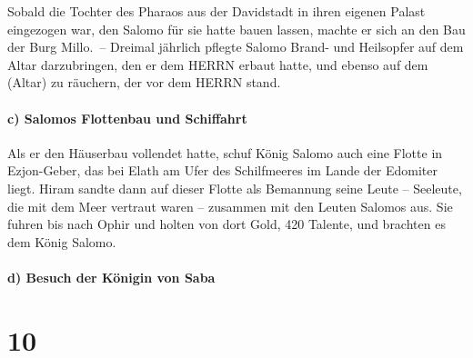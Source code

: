 Sobald die Tochter des Pharaos aus der Davidstadt in
ihren eigenen Palast eingezogen war, den Salomo für sie hatte bauen
lassen, machte er sich an den Bau der Burg Millo.~--
Dreimal jährlich pflegte Salomo Brand- und Heilsopfer auf
dem Altar darzubringen, den er dem HERRN erbaut hatte, und ebenso auf
dem (Altar) zu räuchern, der vor dem HERRN stand.

\hypertarget{c-salomos-flottenbau-und-schiffahrt}{%
\paragraph{c) Salomos Flottenbau und
Schiffahrt}\label{c-salomos-flottenbau-und-schiffahrt}}

Als er den Häuserbau vollendet hatte, schuf König Salomo
auch eine Flotte in Ezjon-Geber, das bei Elath am Ufer des Schilfmeeres
im Lande der Edomiter liegt. Hiram sandte dann auf dieser
Flotte als Bemannung seine Leute -- Seeleute, die mit dem Meer vertraut
waren -- zusammen mit den Leuten Salomos aus. Sie fuhren
bis nach Ophir und holten von dort Gold, 420 Talente, und brachten es
dem König Salomo.

\hypertarget{d-besuch-der-kuxf6nigin-von-saba}{%
\paragraph{d) Besuch der Königin von
Saba}\label{d-besuch-der-kuxf6nigin-von-saba}}

\hypertarget{section-9}{%
\section{10}\label{section-9}}


